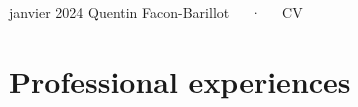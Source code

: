 \documentclass[11pt,a4paper,]{awesome-cv}
\begin{document}
\makecvheader

\makecvfooter
  {janvier 2024}
    {Quentin Facon-Barillot~~~·~~~CV}
  {\thepage}





\hypertarget{professional-experiences}{%
\section{Professional experiences}\label{professional-experiences}}
\end{document}
